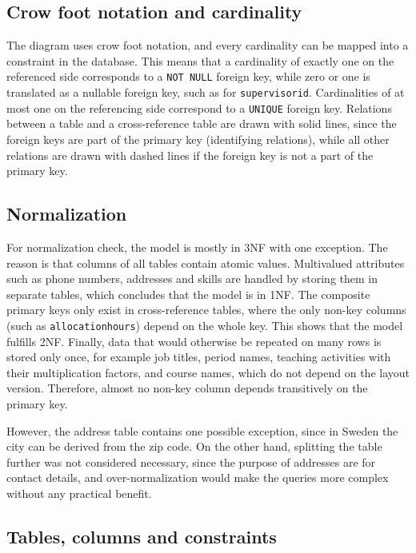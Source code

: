 \documentclass[a4paper]{scrartcl}
\renewcommand{\_}{\textunderscore\allowbreak}
\begin{document}
\subsection{Crow foot notation and cardinality}

The diagram uses crow foot notation, and every cardinality can be mapped into a constraint in the database. This means that a cardinality of exactly one on the referenced side corresponds to a \texttt{NOT NULL} foreign key, while zero or one is translated as a nullable foreign key, such as for \texttt{supervisor\_id}. Cardinalities of at most one on the referencing side correspond to a \texttt{UNIQUE} foreign key. Relations between a table and a cross-reference table are drawn with solid lines, since the foreign keys are part of the primary key (identifying relations), while all other relations are drawn with dashed lines if the foreign key is not a part of the primary key.

\subsection{Normalization}

For normalization check, the model is mostly in 3NF with one exception. The reason is that columns of all tables contain atomic values. Multivalued attributes such as phone numbers, addresses and skills are handled by storing them in separate tables, which concludes that the model is in 1NF. The composite primary keys only exist in cross-reference tables, where the only non-key columns (such as \texttt{allocation\_hours}) depend on the whole key. This shows that the model fulfills 2NF. Finally, data that would otherwise be repeated on many rows is stored only once, for example job titles, period names, teaching activities with their multiplication factors, and course names, which do not depend on the layout version. Therefore, almost no non-key column depends transitively on the primary key.

However, the address table contains one possible exception, since in Sweden the city can be derived from the zip code. On the other hand, splitting the table further was not considered necessary, since the purpose of addresses are for contact details, and over-normalization would make the queries more complex without any practical benefit.

\subsection{Tables, columns and constraints}
\end{document}
